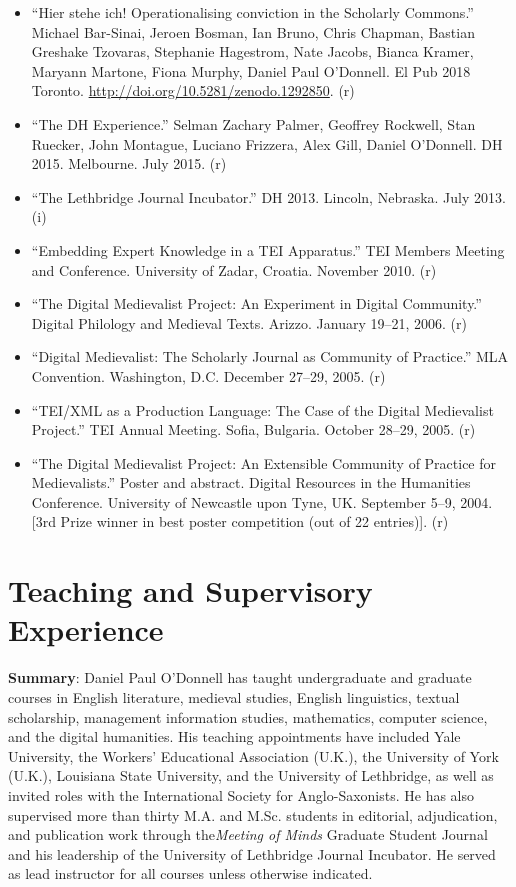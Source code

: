 \documentclass[12pt]{article}
\begin{document}
\begin{itemize}
  \item “Hier stehe ich! Operationalising conviction in the Scholarly Commons.” Michael Bar-Sinai, Jeroen Bosman, Ian Bruno, Chris Chapman, Bastian Greshake Tzovaras, Stephanie Hagestrom, Nate Jacobs, Bianca Kramer, Maryann Martone, Fiona Murphy, Daniel Paul O’Donnell. El Pub 2018 Toronto. \url{http://doi.org/10.5281/zenodo.1292850}. (r)
  \item “The DH Experience.” Selman Zachary Palmer\*, Geoffrey Rockwell, Stan Ruecker, John Montague, Luciano Frizzera, Alex Gill, Daniel O’Donnell. DH 2015. Melbourne. July 2015. (r)
  \item “The Lethbridge Journal Incubator.” DH 2013. Lincoln, Nebraska. July 2013. (i)
  \item “Embedding Expert Knowledge in a TEI Apparatus.” TEI Members Meeting and Conference. University of Zadar, Croatia. November 2010. (r)
  \item “The Digital Medievalist Project: An Experiment in Digital Community.” Digital Philology and Medieval Texts. Arizzo. January 19–21, 2006. (r)
  \item “Digital Medievalist: The Scholarly Journal as Community of Practice.” MLA Convention. Washington, D.C. December 27–29, 2005. (r)
  \item “TEI/XML as a Production Language: The Case of the Digital Medievalist Project.” TEI Annual Meeting. Sofia, Bulgaria. October 28–29, 2005. (r)
  \item “The Digital Medievalist Project: An Extensible Community of Practice for Medievalists.” Poster and abstract. Digital Resources in the Humanities Conference. University of Newcastle upon Tyne, UK. September 5–9, 2004. [3rd Prize winner in best poster competition (out of 22 entries)]. (r)
\end{itemize}


\section*{Teaching and Supervisory Experience}

\textbf{Summary}: Daniel Paul O’Donnell has taught undergraduate and graduate courses in English literature, medieval studies, English linguistics, textual scholarship, management information studies, mathematics, computer science, and the digital humanities. His teaching appointments have included Yale University, the Workers’ Educational Association (U.K.), the University of York (U.K.), Louisiana State University, and the University of Lethbridge, as well as invited roles with the International Society for Anglo-Saxonists. He has also supervised more than thirty M.A. and M.Sc. students in editorial, adjudication, and publication work through the\textit{Meeting of Minds} Graduate Student Journal and his leadership of the University of Lethbridge Journal Incubator. He served as lead instructor for all courses unless otherwise indicated.
\end{document}
